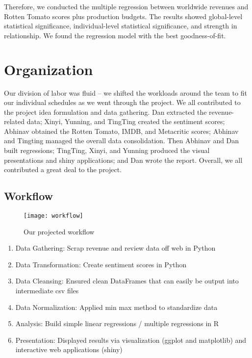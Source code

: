 \documentclass{article}
\begin{document}
Therefore, we conducted the multiple regression between worldwide revenues and Rotten Tomato scores plus production budgets.  The results showed global-level statistical significance, individual-level statistical significance, and strength in relationship.  We found the regression model with the best goodness-of-fit.

\section{Organization}

Our division of labor was fluid – we shifted the workloads around the team to fit our individual schedules as we went through the project.  We all contributed to the project idea formulation and data gathering.  Dan extracted the revenue-related data; Xinyi, Yunning, and TingTing created the sentiment scores; Abhinav obtained the Rotten Tomato, IMDB, and Metacritic scores; Abhinav and Tingting managed the overall data consolidation.  Then Abhinav and Dan built regressions; TingTing, Xinyi, and Yunning produced the visual presentations and shiny applications; and Dan wrote the report.  Overall, we all contributed a great deal to the project.
\newpage

\subsection{Workflow}

\begin{figure}
  \centering
	\texttt{[image: workflow]}
  \caption{Our projected workflow}
\end{figure}

\begin{enumerate}
	\item Data Gathering:  Scrap revenue and review data off web in Python
	\item Data Transformation:  Create sentiment scores in Python
	\item Data Cleansing:  Ensured clean DataFrames that can easily be output into intermediate csv files
	\item Data Normalization:  Applied min max method to standardize data
	\item Analysis:  Build simple linear regressions / multiple regressions in R
	\item Presentation:  Displayed results via visualization (ggplot and matplotlib) and interactive web applications (shiny)
\end{enumerate}
\end{document}
